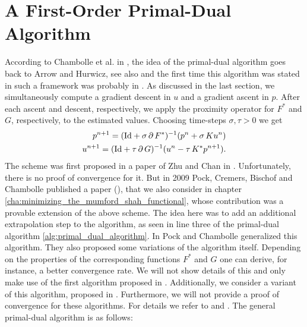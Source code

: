 \documentclass{scrreprt}
\begin{document}
    \section{A First-Order Primal-Dual Algorithm} %
    \label{sec:a_firs_order_primal_dual_algorithm}

        According to Chambolle et al. in \cite{Chambolle-et-al-10}, the idea of the primal-dual algorithm goes back to Arrow and Hurwicz, see also \cite{Arrow-Hurwicz} and the first time this algorithm was stated in such a framework was probably in \cite{Appleton-Talbot}. As discussed in the last section, we simultaneously compute a gradient descent in $u$ and a gradient ascent in $p$. After each ascent and descent, respectively, we apply the proximity operator for $F^{\ast}$ and $G$, respectively, to the estimated values. Choosing time-steps $\sigma, \tau > 0$ we get
            \begin{eqnarray}
                p^{n+1} = (\textnormal{Id} + \sigma\,\partial\,F^{\ast})^{-1}(p^{n} + \sigma\,Ku^{n}) \notag \\
                u^{n+1} = (\textnormal{Id} + \tau\,\partial\,G)^{-1}(u^{n} - \tau\,K^{\ast}p^{n+1}). \notag
            \end{eqnarray}
        The scheme was first proposed in a paper of Zhu and Chan in \cite{Zhu-Chan}. Unfortunately, there is no proof of convergence for it. But in 2009 Pock, Cremers, Bischof and Chambolle published a paper (\cite{Pock-et-al-iccv09}), that we also consider in chapter \ref{cha:minimizing_the_mumford_shah_functional}, whose contribution was a provable extension of the above scheme. The idea here was to add an additional extrapolation step to the algorithm, as seen in line three of the primal-dual algorithm \ref{alg:primal_dual_algorithm}. In \cite{Chambolle10afirst-order} Pock and Chambolle generalized this algorithm. They also proposed some variations of the algorithm itself. Depending on the properties of the corresponding functions $F^{\ast}$ and $G$ one can derive, for instance, a better convergence rate. We will not show details of this and only make use of the first algorithm proposed in \cite{Chambolle10afirst-order}. Additionally, we consider a variant of this algorithm, proposed in \cite{Strekalovskiy-Cremers-eccv14}. Furthermore, we will not provide a proof of convergence for these algorithms. For details we refer to \cite{Chambolle10afirst-order} and \cite{Pock-et-al-iccv09}. The general primal-dual algorithm is as follows:
\end{document}
